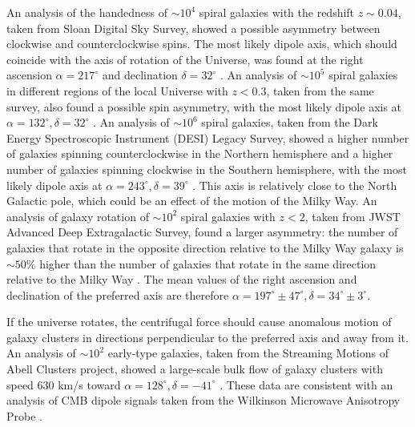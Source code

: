 \documentclass[prd,onecolumn,nofootinbib]{revtex4}
\begin{document}
An analysis of the handedness of $\sim 10^4$ spiral galaxies with the redshift $z\sim 0.04$, taken from Sloan Digital Sky Survey, showed a possible asymmetry between clockwise and counterclockwise spins.
The most likely dipole axis, which should coincide with the axis of rotation of the Universe, was found at the right ascension $\alpha=217^\circ$ and declination $\delta=32^\circ$ \cite{gal1}.
An analysis of $\sim 10^5$ spiral galaxies in different regions of the local Universe with $z<0.3$, taken from the same survey, also found a possible spin asymmetry, with the most likely dipole axis at $\alpha=132^\circ, \delta=32^\circ$ \cite{gal2}.
An analysis of $\sim 10^6$ spiral galaxies, taken from the Dark Energy Spectroscopic Instrument (DESI) Legacy Survey, showed a higher number of galaxies spinning counterclockwise in the Northern hemisphere and a higher number of galaxies spinning clockwise in the Southern hemisphere, with the most likely dipole axis at $\alpha=243^\circ, \delta=39^\circ$ \cite{gal3}.
This axis is relatively close to the North Galactic pole, which could be an effect of the motion of the Milky Way.
An analysis of galaxy rotation of $\sim 10^2$ spiral galaxies with $z<2$, taken from JWST Advanced Deep Extragalactic Survey, found a larger asymmetry: the number of galaxies that rotate in the opposite direction relative to the Milky Way galaxy is $\sim50\%$ higher than the number of galaxies that rotate in the same direction relative to the Milky Way \cite{gal4}.
The mean values of the right ascension and declination of the preferred axis are therefore $\alpha=197^\circ\pm 47^\circ, \delta=34^\circ\pm 3^\circ$.

If the universe rotates, the centrifugal force should cause anomalous motion of galaxy clusters in directions perpendicular to the preferred axis and away from it.
An analysis of $\sim 10^2$ early-type galaxies, taken from the Streaming Motions of Abell Clusters project, showed a large-scale bulk flow of galaxy clusters with speed 630 km/s toward $\alpha=128^\circ, \delta=-41^\circ$ \cite{clu1}.
These data are consistent with an analysis of CMB dipole signals taken from the Wilkinson Microwave Anisotropy Probe \cite{clu2}.
\end{document}

